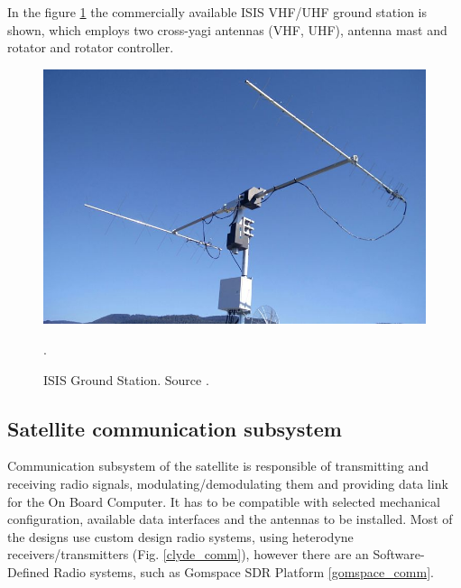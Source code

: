 In the figure \ref{isis_gs} the commercially available ISIS VHF/UHF ground station is shown, which employs two cross-yagi antennas (VHF, UHF), antenna mast and rotator and rotator controller.

\begin{figure}
    \centering
    \includegraphics[width=0.5\paperwidth]{img/2/isis_gs.jpg}
    \caption{ISIS Ground Station. Source \cite{isis_gs}.}.
    \label{isis_gs}
\end{figure}

\subsection{Satellite communication subsystem}
Communication subsystem of the satellite is responsible of transmitting and receiving radio signals, modulating/demodulating them and providing data link for the On Board Computer. It has to be compatible with selected mechanical configuration, available data interfaces and the antennas to be installed. Most of the designs use custom design radio systems, using heterodyne receivers/transmitters (Fig. \ref{clyde_comm}), however there are an Software-Defined Radio systems, such as Gomspace SDR Platform \ref{gomspace_comm}.

